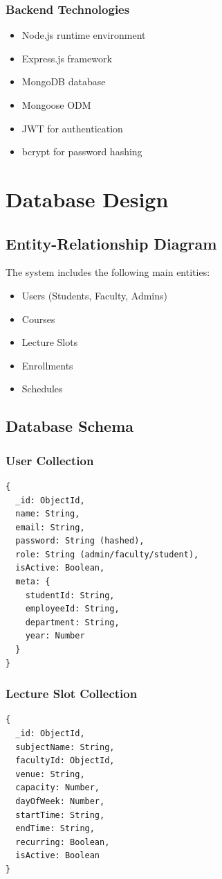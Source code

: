 \documentclass[12pt,a4paper]{report}
\begin{document}
\subsubsection{Backend Technologies}
\begin{itemize}[leftmargin=*]
    \item Node.js runtime environment
    \item Express.js framework
    \item MongoDB database
    \item Mongoose ODM
    \item JWT for authentication
    \item bcrypt for password hashing
\end{itemize}

\section{Database Design}

\subsection{Entity-Relationship Diagram}
The system includes the following main entities:
\begin{itemize}[leftmargin=*]
    \item Users (Students, Faculty, Admins)
    \item Courses
    \item Lecture Slots
    \item Enrollments
    \item Schedules
\end{itemize}

\subsection{Database Schema}

\subsubsection{User Collection}
\begin{verbatim}
{
  _id: ObjectId,
  name: String,
  email: String,
  password: String (hashed),
  role: String (admin/faculty/student),
  isActive: Boolean,
  meta: {
    studentId: String,
    employeeId: String,
    department: String,
    year: Number
  }
}
\end{verbatim}

\subsubsection{Lecture Slot Collection}
\begin{verbatim}
{
  _id: ObjectId,
  subjectName: String,
  facultyId: ObjectId,
  venue: String,
  capacity: Number,
  dayOfWeek: Number,
  startTime: String,
  endTime: String,
  recurring: Boolean,
  isActive: Boolean
}
\end{verbatim}
\end{document}
